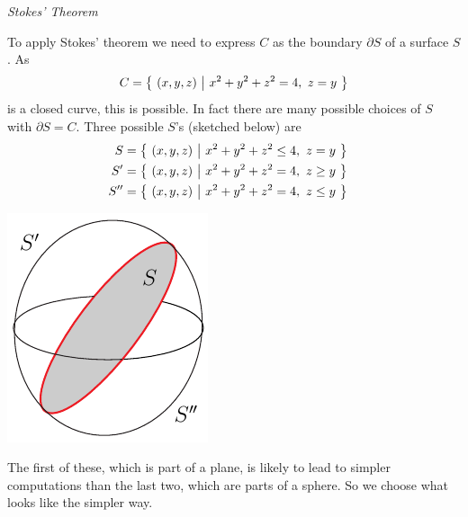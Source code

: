\begin{eg}
\medskip
\noindent
\emph{Stokes' Theorem}

To apply Stokes' theorem we need to express $C$ as the boundary 
$\partial S$ of a surface $S$. As
\begin{equation*}
C=\big\{ \ (x,y,z)\ \big|\ x^2+y^2+z^2=4,\ z=y\ \big\}
\end{equation*}
is a closed curve, this is possible. In fact there are many possible choices
of $S$ with $\partial S=C$. Three possible $S$'s (sketched below) are
\begin{align*}
S&=\big\{ \ (x,y,z)\ \big|\ x^2+y^2+z^2\le 4,\ z=y\ \big\}\cr
S'&=\big\{ \ (x,y,z)\ \big|\ x^2+y^2+z^2= 4,\ z\ge y\ \big\}\cr
S''&=\big\{ \ (x,y,z)\ \big|\ x^2+y^2+z^2= 4,\ z\le y\ \big\}
\end{align*}
\begin{nfig}
\begin{center}
    \includegraphics{circle4b.pdf}
\end{center}
\end{nfig}
The first of these, which is part of a plane, is likely to lead to simpler 
computations than the last two, which are parts of a sphere. So we choose
what looks like the simpler way.


\end{eg}
